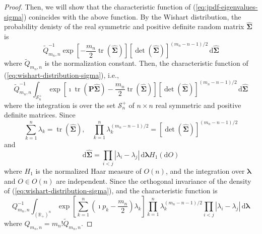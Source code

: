 \begin{proof}
    Then, we will show that the characteristic function of (\ref{eq:jpdf-eigenvalues-sigma}) conincides with the above function. By the Wishart distribution, the probability denisty of the real symmetric and positive definite random matrix $\widehat{\boldsymbol{\Sigma}}$ is
    \begin{equation}
        \widetilde{Q}_{m_{n},n}^{-1}\exp\left[-\frac{m_{n}}{2}\operatorname{tr}\left(\widehat{\boldsymbol{\Sigma}}\right)\right]\left[\operatorname{det}\left(\widehat{\boldsymbol{\Sigma}}\right)\right]^{(m_{n}-n-1)/2}\,\mathrm{d}\widehat{\boldsymbol{\Sigma}}
        \label{eq:wishart-distribution-sigma}
    \end{equation}
    where $\widetilde{Q}_{m_{n},n}$ is the normalization constant. Then, the characteristic function of (\ref{eq:wishart-distribution-sigma}), i.e.,
    \begin{equation*}
        \widetilde{Q}_{m_{n},n}^{-1}\int_{\mathcal{S}_{n}^{+}}\exp\left[\imath\operatorname{tr}\left(\mathbf{P}\widehat{\boldsymbol{\Sigma}}\right)-\frac{m_{n}}{2}\operatorname{tr}\left(\widehat{\boldsymbol{\Sigma}}\right)\right]\left[\operatorname{det}\left(\widehat{\boldsymbol{\Sigma}}\right)\right]^{(m_{n}-n-1)/2}\,\mathrm{d}\widehat{\boldsymbol{\Sigma}}
    \end{equation*}
    where the integration is over the set $\mathcal{S}_{n}^{+}$ of $n\times n$ real symmetric and positive definite matrices. Since
    \begin{equation*}
        \sum_{k=1}^{n}\lambda_{k}=\operatorname{tr}\left(\widehat{\boldsymbol{\Sigma}}\right),\quad\prod_{k=1}^{n}\lambda_{k}^{(m_{n}-n-1)/2}=\left[\operatorname{det}\left(\widehat{\boldsymbol{\Sigma}}\right)\right]^{(m_{n}-n-1)/2}
    \end{equation*}
    and
    \begin{equation*}
        \mathrm{d}\widehat{\boldsymbol{\Sigma}}=\prod_{i<j}\left|\lambda_{i}-\lambda_{j}\right|\,\mathrm{d}\boldsymbol{\lambda}H_{1}\left(\mathrm{d}O\right)
    \end{equation*}
    where $H_{1}$ is the normalized Haar measure of $O(n)$, and the integration over $\boldsymbol{\lambda}$ and $O\in O(n)$ are independent. Since the orthogonal invariance of the density of (\ref{eq:wishart-distribution-sigma}), and the characteristic function is
    \begin{equation}
        Q_{m_{n},n}^{-1}\int_{\left(\mathbb{R}_{+}\right)^{n}}\exp\left[\sum_{k=1}^{n}\left(\imath p_{k}-\frac{m_{n}}{2}\right)\lambda_{k}\right]\prod_{k=1}^{n}\lambda_{k}^{(m_{n}-n-1)/2}\prod_{i<j}\left|\lambda_{i}-\lambda_{j}\right|\,\mathrm{d}\boldsymbol{\lambda}
        \label{eq:characteristic-function-wishart}
    \end{equation}
    where $Q_{m_{n},n}=m_{n}!\widetilde{Q}_{m_{n},n}$.


\end{proof}
